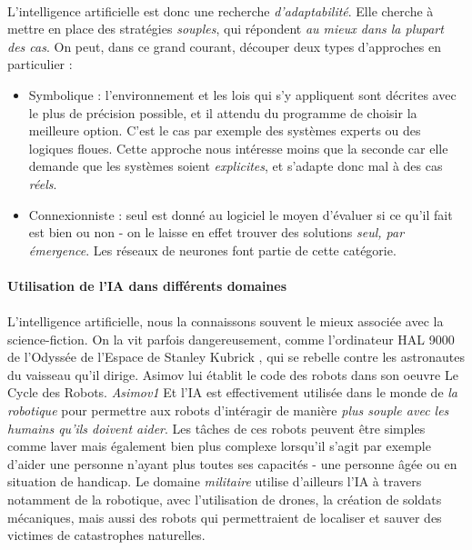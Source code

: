 \paragraph{} L'intelligence artificielle est donc une recherche \emph{d'adaptabilité}. Elle cherche à mettre en place des
stratégies \emph{souples}, qui répondent \emph{au mieux dans la plupart des cas}. On peut, dans ce grand courant, découper
deux types d'approches en particulier :
\begin{itemize}
    \item Symbolique : l'environnement et les lois qui s'y appliquent sont décrites avec le plus de précision possible,
    et il attendu du programme de choisir la meilleure option. C'est le cas par exemple des systèmes experts ou des
    logiques floues. Cette approche nous intéresse moins que la seconde car elle demande que les systèmes soient \emph{
    explicites}, et s'adapte donc mal à des cas \emph{réels}.
    \item Connexionniste : seul est donné au logiciel le moyen d'évaluer si ce qu'il fait est bien ou non - on le laisse
    en effet trouver des solutions \emph{seul, par émergence}. Les réseaux de neurones font partie de cette catégorie.
\end{itemize}

\paragraph{Utilisation de l'IA dans différents domaines}

\paragraph{} L'intelligence artificielle, nous la connaissons souvent le mieux associée avec la science-fiction. On
la vit parfois dangereusement, comme l'ordinateur HAL 9000 de l'Odyssée de l'Espace de Stanley Kubrick \cite{Kubrick0},
qui se rebelle contre les astronautes du vaisseau qu'il dirige. Asimov lui établit le code des robots dans son oeuvre
Le Cycle des Robots. \emph{Asimov1} Et l'IA est effectivement utilisée dans le monde de \emph{la robotique} pour permettre aux
robots d'intéragir de manière \emph{plus souple avec les humains qu'ils doivent aider}. \cite{AI1} Les tâches de ces 
robots peuvent être simples comme laver mais également bien plus complexe lorsqu'il s'agit par exemple d'aider une
personne n'ayant plus toutes ses capacités - une personne âgée ou en situation de handicap. Le domaine \emph{militaire} utilise
d'ailleurs l'IA à travers notamment de la robotique, avec l'utilisation de drones, la création de soldats mécaniques,
mais aussi des robots qui permettraient de localiser et sauver des victimes de catastrophes naturelles.

